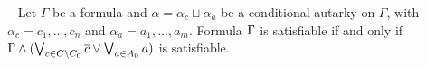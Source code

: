 %
%
%
%
%
%
%





\begin{theorem}~\label{thm:shrunkgbcequisat}
    Let $\Gamma$ be a formula and $\alpha = \alpha_c \sqcup \alpha_a$ be a conditional autarky on $\Gamma$, with $\alpha_c = c_1, \dots, c_n$ and $\alpha_a = a_1, \dots, a_m$. Formula $\Gamma$ is satisfiable if and only if $\Gamma \land (\bigvee_{c \in C \backslash C_0} \overline{c} \lor \bigvee_{a \in A_0} a)$ is satisfiable.
\end{theorem}

